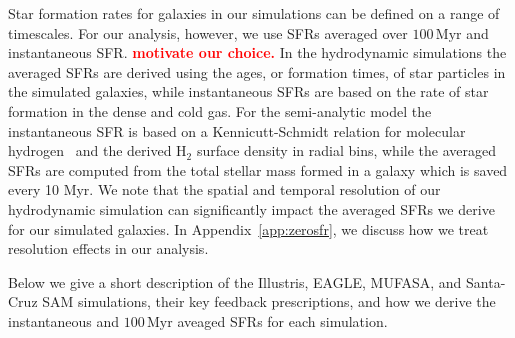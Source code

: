 \documentclass[preprint2,tighten]{aastex62}
\newcommand{\todo}[1]{{\bf \textcolor{red}{ #1}}}
\begin{document}
Star formation rates for galaxies in our simulations can be defined on 
a range of timescales. For our analysis, however, we use SFRs averaged 
over $100\,\mathrm{Myr}$ and instantaneous SFR. \todo{motivate our choice.}
In the hydrodynamic simulations the averaged SFRs are derived using the ages, or formation times, of star particles in the simulated 
galaxies, while instantaneous SFRs are based on 
the rate of star formation in the dense and cold gas. For the semi-analytic model the instantaneous SFR is based on a Kennicutt-Schmidt relation for molecular hydrogen~\citep{bigiel2008} and the derived H$_2$ surface density in radial bins, while the averaged SFRs are computed from the total stellar mass formed in a galaxy which is saved every 10 Myr. 
We note that the spatial and temporal resolution of our hydrodynamic 
simulation can significantly impact the averaged SFRs we derive for our 
simulated galaxies. In Appendix~\ref{app:zerosfr}, we discuss how we treat
resolution effects in our analysis. 

Below we give a short description of the Illustris, EAGLE, MUFASA, and 
Santa-Cruz SAM simulations, their key feedback prescriptions, and how 
we derive the instantaneous and $100\,\mathrm{Myr}$ aveaged SFRs for 
each simulation.


\end{document}
